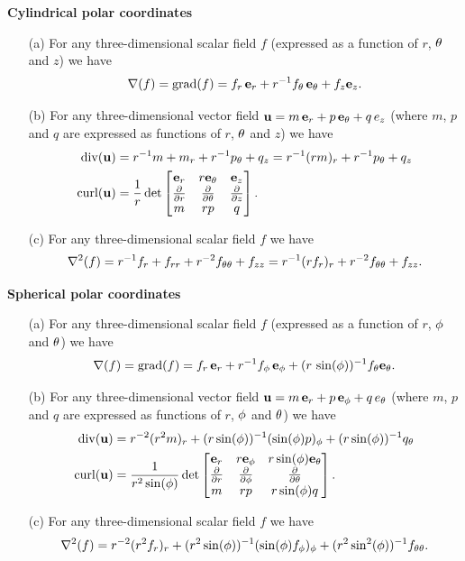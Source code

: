 \documentclass[a4paper]{amsart}
\begin{document}
\vspace{3ex}

\begin{center}
 \Large \textbf{Cylindrical polar coordinates}
\end{center}

 \begin{itemize}
  \item[(a)] For any three-dimensional scalar field $f$ (expressed as a
   function of $r$, $\theta$ and $z$) we have 
   \[ \nabla(f) = \operatorname{grad}(f) = f_r\,\mathbf{e}_r + r^{-1}f_\theta\,\mathbf{e}_\theta + f_z\mathbf{e}_z. \]
  \item[(b)] For any three-dimensional vector field
   $\mathbf{u}=m\,\mathbf{e}_r+p\,\mathbf{e}_\theta+q\,e_z$ (where $m$, $p$ and $q$ are expressed as
   functions of $r$, $\theta$ and $z$) we have 
   \begin{align*}
    \operatorname{div}(\mathbf{u})
     &= r^{-1}m + m_r + r^{-1}p_\theta + q_z 
      = r^{-1}(rm)_r + r^{-1}p_\theta + q_z \\
    \operatorname{curl}(\mathbf{u})
     &= \frac{1}{r} \det\left[\begin{matrix}
          \mathbf{e}_r & r\mathbf{e}_\theta & \mathbf{e}_z \\
          \frac{\partial}{\partial r}  & \frac{\partial}{\partial\theta}      & \frac{\partial}{\partial z}  \\
          m     & rp        & q \end{matrix}\right].
   \end{align*}
  \item[(c)] For any three-dimensional scalar field $f$ we have 
   \[ \nabla^2(f) = r^{-1}f_r + f_{rr} + r^{-2}f_{\theta\theta} + f_{zz}
        = r^{-1}(rf_r)_r + r^{-2}f_{\theta\theta} + f_{zz}.
   \]
 \end{itemize}

\vspace{3ex}

\begin{center}
 \Large \textbf{Spherical polar coordinates}
\end{center}

 \begin{itemize}
  \item[(a)] For any three-dimensional scalar field $f$ (expressed as a
   function of $r$, $\phi$ and $\theta$) we have 
   \[ \nabla(f) = \operatorname{grad}(f) =
        f_r\,\mathbf{e}_r + r^{-1}f_\phi\,\mathbf{e}_\phi +
         (r\,\sin(\phi))^{-1}f_\theta\mathbf{e}_\theta.
   \]
  \item[(b)] For any three-dimensional vector field
   $\mathbf{u}=m\,\mathbf{e}_r+p\,\mathbf{e}_\phi+q\,e_\theta$ (where $m$, $p$ and $q$ are expressed as
   functions of $r$, $\phi$ and $\theta$) we have 
   \begin{align*}
    \operatorname{div}(\mathbf{u})
     &= r^{-2}(r^2m)_r + (r\sin(\phi))^{-1}(\sin(\phi)p)_\phi + 
         (r\sin(\phi))^{-1}q_\theta \\
    \operatorname{curl}(\mathbf{u})
     &= \frac{1}{r^2\sin(\phi)} \det\left[\begin{matrix}
          \mathbf{e}_r & r\mathbf{e}_\phi & r\sin(\phi)\mathbf{e}_\theta \\
          \frac{\partial}{\partial r}  & \frac{\partial}{\partial\phi}      & \frac{\partial}{\partial\theta}  \\
          m     & rp        & r\sin(\phi)q \end{matrix}\right].
   \end{align*}
  \item[(c)] For any three-dimensional scalar field $f$ we have 
   \[ \nabla^2(f) = 
      r^{-2}(r^2f_r)_r +
      (r^2\sin(\phi))^{-1}(\sin(\phi)f_\phi)_\phi + 
      (r^2\sin^2(\phi))^{-1} f_{\theta\theta}.
   \]
 \end{itemize}
\end{document}

